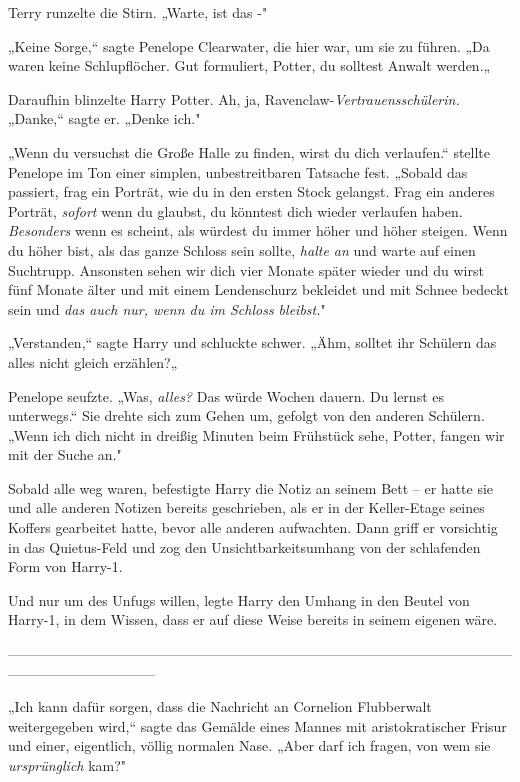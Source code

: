 {Terry runzelte die Stirn. „Warte, ist das -"

„Keine Sorge,“ sagte Penelope Clearwater, die hier war, um sie zu führen. „Da waren keine Schlupflöcher. Gut formuliert, Potter, du solltest Anwalt werden.„

Daraufhin blinzelte Harry Potter. Ah, ja, Ravenclaw-\emph{Vertrauensschülerin.} „Danke,“ sagte er. „Denke ich."

„Wenn du versuchst die Große Halle zu finden, wirst du dich verlaufen.“ stellte Penelope im Ton einer simplen, unbestreitbaren Tatsache fest. „Sobald das passiert, frag ein Porträt, wie du in den ersten Stock gelangst. Frag ein anderes Porträt, \emph{sofort} wenn du glaubst, du könntest dich wieder verlaufen haben. \emph{Besonders} wenn es scheint, als würdest du immer höher und höher steigen. Wenn du höher bist, als das ganze Schloss sein sollte, \emph{halte an} und warte auf einen Suchtrupp. Ansonsten sehen wir dich vier Monate später wieder und du wirst fünf Monate älter und mit einem Lendenschurz bekleidet und mit Schnee bedeckt sein und \emph{das auch nur, wenn du im Schloss bleibst.}"

„Verstanden,“ sagte Harry und schluckte schwer. „Ähm, solltet ihr Schülern das alles nicht gleich erzählen?„

Penelope seufzte. „Was, \emph{alles?} Das würde Wochen dauern. Du lernst es unterwegs.“ Sie drehte sich zum Gehen um, gefolgt von den anderen Schülern. „Wenn ich dich nicht in dreißig Minuten beim Frühstück sehe, Potter, fangen wir mit der Suche an."

Sobald alle weg waren, befestigte Harry die Notiz an seinem Bett -- er hatte sie und alle anderen Notizen bereits geschrieben, als er in der Keller-Etage seines Koffers gearbeitet hatte, bevor alle anderen aufwachten. Dann griff er vorsichtig in das Quietus-Feld und zog den Unsichtbarkeitsumhang von der schlafenden Form von Harry-1.

Und nur um des Unfugs willen, legte Harry den Umhang in den Beutel von Harry-1, in dem Wissen, dass er auf diese Weise bereits in seinem eigenen wäre.

--------------------------------------------------------------------------------------------------------------------------------------------

\hfill\break „Ich kann dafür sorgen, dass die Nachricht an Cornelion Flubberwalt weitergegeben wird,“ sagte das Gemälde eines Mannes mit aristokratischer Frisur und einer, eigentlich, völlig normalen Nase. „Aber darf ich fragen, von wem sie \emph{ursprünglich} kam?"

}
